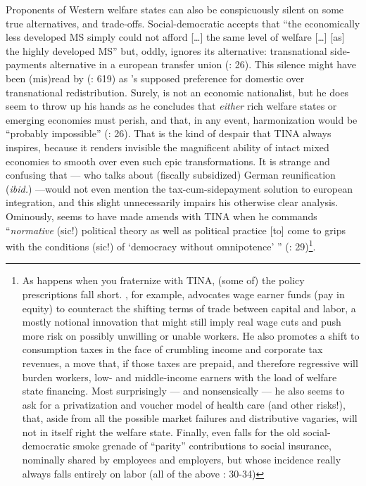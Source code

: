 Proponents of Western welfare states can also be conspicuously silent on some true alternatives, and trade-offs. Social-democratic \cite{Scharpf1997} accepts that ``the economically less developed \gls{MS} simply could not afford [\ldots] the same level of welfare [\ldots] [as] the highly developed \gls{MS}'' but, oddly, ignores its alternative: transnational side-payments alternative in a european transfer union (\citeyear{Scharpf1997}: 26). This silence might have been (mis)read by \citeauthor{Moravcsik-2002-aa} (\citeyear{Moravcsik-2002-aa}: 619) as \citeauthor{Scharpf1997}'s supposed preference for domestic over transnational redistribution. Surely, \citeauthor{Scharpf1997} is not an economic nationalist, but he does seem to throw up his hands as he concludes that \emph{either} rich welfare states or emerging economies must perish, and that, in any event, harmonization would be ``probably impossible'' (\citeyear{Scharpf1997}: 26). That is the kind of despair that TINA always inspires, because it renders invisible the magnificent ability of intact mixed economies to smooth over even such epic transformations. It is strange and confusing that \citeauthor{Scharpf1997} --- who talks about (fiscally subsidized) German reunification (\emph{ibid.}) ---would not even mention the tax-cum-sidepayment solution to european integration, and this slight unnecessarily impairs his otherwise clear analysis. Ominously, \citeauthor{Scharpf1997} seems to have made amends with TINA when he commands ``\emph{normative} (sic!) political theory as well as political practice [to] come to grips with the conditions (sic!) of `democracy without omnipotence' '' (\citeyear{Scharpf1997}: 29)\footnote{
	As happens when you fraternize with TINA, (some of) the policy prescriptions fall short. \citeauthor{Scharpf1997}, for example, advocates wage earner funds (pay in equity) to counteract the shifting terms of trade between capital and labor, a mostly notional innovation that might still imply real wage cuts and push more risk on possibly unwilling or unable workers. He also promotes a shift to consumption taxes in the face of crumbling income and corporate tax revenues, a move that, if those taxes are prepaid, and therefore regressive will burden workers, low- and middle-income earners with the load of welfare state financing. Most surprisingly --- and nonsensically --- he also seems to ask for a privatization and voucher model of health care (and other risks!), that, aside from all the possible market failures and distributive vagaries, will not in itself right the welfare state. Finally, \citeauthor{Scharpf1997} even falls for the old social-democratic smoke grenade of ``parity'' contributions to social insurance, nominally shared by employees and employers, but whose incidence really always falls entirely on labor (all of the above \citeyear{Scharpf1997}: 30-34)}.

